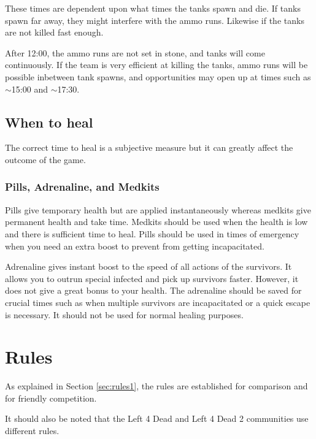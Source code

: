 These times are dependent upon what times the tanks spawn and die. If tanks spawn far away, they might interfere with the ammo runs. Likewise if the tanks are not killed fast enough.

After 12:00, the ammo runs are not set in stone, and tanks will come continuously. If the team is very efficient at killing the tanks, ammo runs will be possible inbetween tank spawns, and opportunities may open up at times such as $\sim$15:00 and $\sim$17:30.

\subsection{When to heal}
The correct time to heal is a subjective measure but it can greatly affect the outcome of the game.

\subsubsection{Pills, Adrenaline, and Medkits}
Pills give temporary health but are applied instantaneously whereas medkits give permanent health and take time. Medkits should be used when the health is low and there is sufficient time to heal. Pills should be used in times of emergency when you need an extra boost to prevent from getting incapacitated.

Adrenaline gives instant boost to the speed of all actions of the survivors. It allows you to outrun special infected and pick up survivors faster. However, it does not give a great bonus to your health. The adrenaline should be saved for crucial times such as when multiple survivors are incapacitated or a quick escape is necessary. It should not be used for normal healing purposes.

\section{Rules}
As explained in Section \ref{sec:rules1}, the rules are established for comparison and for friendly competition.

It should also be noted that the Left 4 Dead and Left 4 Dead 2 communities use different rules.

